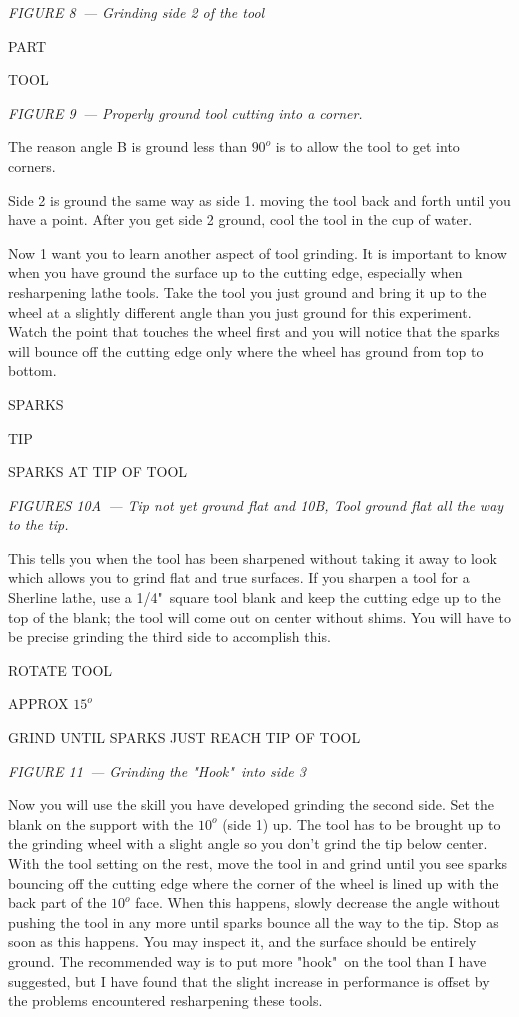 \textit{FIGURE 8\ --- Grinding side 2 of the tool}
\bigskip

\bigskip
PART

TOOL
\bigskip

\textit{FIGURE 9\ --- Properly ground tool cutting into a corner.}


The reason angle B is ground less than $90^o$ is to allow the tool to get into
corners.

Side 2 is ground the same way as side 1. moving the tool back and forth until
you have a point. After you get side 2 ground, cool the tool in the cup of
water.

Now 1 want you to learn another aspect of tool grinding. It is important to know
when you have ground the surface up to the cutting edge, especially when
resharpening lathe tools. Take the tool you just ground and bring it up to the
wheel at a slightly different angle than you just ground for this experiment.
Watch the point that touches the wheel first and you will notice that the sparks
will bounce off the cutting edge only where the wheel has ground from top to
bottom.

\bigskip
SPARKS

TIP

SPARKS AT TIP OF TOOL
\bigskip

\textit{FIGURES 10A\ --- Tip not yet ground flat and 10B, Tool ground flat all
the way to the tip.}
\bigskip

This tells you when the tool has been sharpened without taking it away to look
which allows you to grind flat and true surfaces. If you sharpen a tool for a
Sherline lathe, use a 1/4"\ square tool blank and keep the cutting edge up to
the top of the blank; the tool will come out on center without shims. You will
have to be precise grinding the third side to accomplish this.


\bigskip
ROTATE TOOL

APPROX $15^o$

GRIND UNTIL SPARKS JUST REACH TIP OF TOOL
\bigskip

\textit{FIGURE 11\ --- Grinding the "Hook"\ into side 3}
\bigskip

Now you will use the skill you have developed grinding the second side. Set the
blank on the support with the $10^o$ (side 1) up. The tool has to be brought up
to the grinding wheel with a slight angle so you don't grind the tip below
center. With the tool setting on the rest, move the tool in and grind until you
see sparks bouncing off the cutting edge where the corner of the wheel is lined
up with the back part of the $10^o$ face. When this happens, slowly decrease the
angle without pushing the tool in any more until sparks bounce all the way to
the tip. Stop as soon as this happens. You may inspect it, and the surface
should be entirely ground. The recommended way is to put more "hook"\ on the tool
than I have suggested, but I have found that the slight increase in performance
is offset by the problems encountered resharpening these tools.

